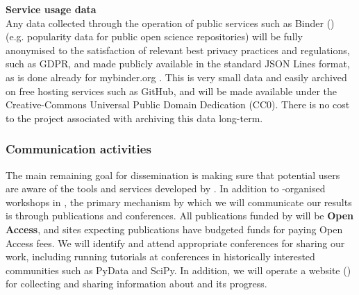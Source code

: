 \noindent \textbf{Service usage data} \\
Any data collected through the operation of public services such as Binder ()
(e.g. popularity data for public open science repositories)
will be fully anonymised to the satisfaction of relevant best privacy practices and regulations, such as GDPR,
and made publicly available in the standard JSON Lines format,
as is done already for mybinder.org \cite{mybinder-archive}.
This is very small data and easily archived on free hosting services such as GitHub,
and will be made available under the Creative-Commons Universal Public Domain Dedication (CC0).
There is no cost to the project associated with archiving this data long-term.

\subsubsection{Communication activities}

The main remaining goal for dissemination is making sure that potential users are aware of the tools and services developed by \TheProject.
In addition to \TheProject-organised workshops in ,
the primary mechanism by which we will communicate our results is through publications and conferences.
All publications funded by \TheProject will be \textbf{Open Access},
and sites expecting publications have budgeted funds for paying Open Access fees.
We will identify and attend appropriate conferences for sharing our work,
including running tutorials at conferences in historically interested communities such as PyData and SciPy. In addition, we will operate a website ()
for collecting and sharing information about \TheProject and its progress.
